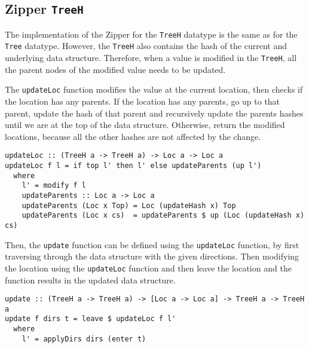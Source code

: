 \subsection{Zipper \texttt{TreeH}}
\label{subsec-zipper-treeh}

The implementation of the Zipper for the \texttt{TreeH} datatype is the same as for the \texttt{Tree} datatype. However, the \texttt{TreeH} also contains the hash of the current and underlying data structure. Therefore, when a value is modified in the \texttt{TreeH}, all the parent nodes of the modified value needs to be updated. 

The \texttt{updateLoc} function modifies the value at the current location, then checks if the location has any parents. If the location has any parents, go up to that parent, update the hash of that parent and recursively update the parents hashes until we are at the top of the data structure. Otherwise, return the modified locations, because all the other hashes are not affected by the change. 

\begin{verbatim}
updateLoc :: (TreeH a -> TreeH a) -> Loc a -> Loc a
updateLoc f l = if top l' then l' else updateParents (up l')
  where
    l' = modify f l
    updateParents :: Loc a -> Loc a
    updateParents (Loc x Top) = Loc (updateHash x) Top
    updateParents (Loc x cs)  = updateParents $ up (Loc (updateHash x) cs)
\end{verbatim}

Then, the \texttt{update} function can be defined using the \texttt{updateLoc} function, by first traversing through the data structure with the given directions. Then modifying the location using the \texttt{updateLoc} function and then leave the location and the function results in the updated data structure.

\begin{verbatim}
update :: (TreeH a -> TreeH a) -> [Loc a -> Loc a] -> TreeH a -> TreeH a 
update f dirs t = leave $ updateLoc f l'
  where
    l' = applyDirs dirs (enter t)
\end{verbatim}
